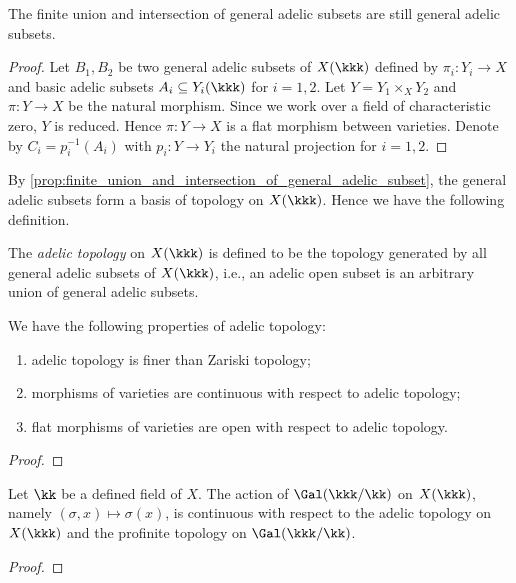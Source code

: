     \begin{lemma}\label{prop:finite_union_and_intersection_of_general_adelic_subset}
        The finite union and intersection of general adelic subsets are still general adelic subsets.
    \end{lemma}
    \begin{proof}
        Let \(B_1,B_2\) be two general adelic subsets of \(X(\kkk)\) defined by \(\pi_i: Y_i \to X\) and basic adelic subsets \(A_i \subseteq Y_i(\kkk)\) for \(i=1,2\).
        Let \(Y = Y_1 \times_X Y_2\) and \(\pi: Y \to X\) be the natural morphism.
        Since we work over a field of characteristic zero, \(Y\) is reduced.
        Hence \(\pi: Y \to X\) is a flat morphism between varieties.
        Denote by \(C_i = p_i^{-1}(A_i)\) with \(p_i: Y \to Y_i\) the natural projection for \(i=1,2\).
        
    \end{proof}


    By \cref{prop:finite_union_and_intersection_of_general_adelic_subset}, the general adelic subsets form a basis of topology on \(X(\kkk)\).
    Hence we have the following definition.

    \begin{definition}\label{def:adelit_topology}
        The \emph{adelic topology} on \(X(\kkk)\) is defined to be the topology generated by all general adelic subsets of \(X(\kkk)\),
        i.e., an adelic open subset is an arbitrary union of general adelic subsets.
    \end{definition}

    \begin{proposition}\label{prop:basic_properties_of_adelic_topology}
        We have the following properties of adelic topology:
        \begin{enumerate}
            \item adelic topology is finer than Zariski topology;
            \item morphisms of varieties are continuous with respect to adelic topology;
            \item flat morphisms of varieties are open with respect to adelic topology.
        \end{enumerate}
    \end{proposition}
    \begin{proof}
    \end{proof}

    \begin{proposition}\label{prop:galois_action_is_continuous_wrt_adelic_and_profinite_topo}
        Let \(\kk\) be a defined field of \(X\).
        The action of \(\Gal(\kkk/\kk)\) on \(X(\kkk)\), namely \((\sigma,x) \mapsto \sigma(x)\), is continuous with respect to the adelic topology on \(X(\kkk)\) and the profinite topology on \(\Gal(\kkk/\kk)\).
    \end{proposition}
    \begin{proof}
    \end{proof}

